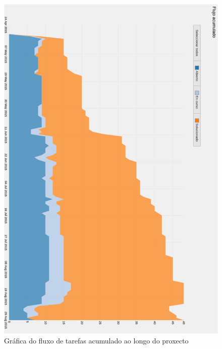 \begin{figure}[htp]
\begin{center}
    \includegraphics[scale=0.35]{figures/YouTrack/fluxoAcumulado.png}
    \caption{Gráfica do fluxo de tarefas acumulado ao longo do proxecto}
\label{fig:fluxoAcumulado}
\end{center}
\end{figure}

